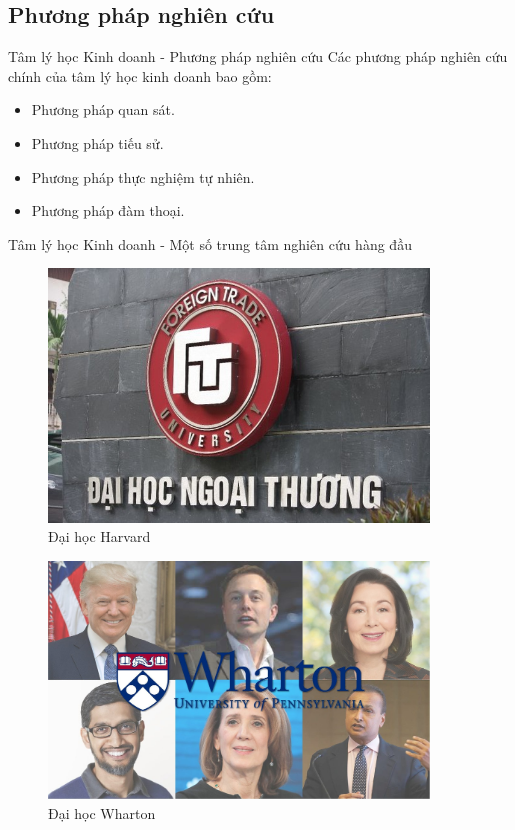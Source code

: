 \documentclass[../main.tex]{subfiles}
\begin{document}
\subsection{Phương pháp nghiên cứu}
\begin{frame}{Tâm lý học Kinh doanh - Phương pháp nghiên cứu}
Các phương pháp nghiên cứu chính của tâm lý học kinh doanh bao gồm:
\begin{itemize}
    \item Phương pháp quan sát.
    \item Phương pháp tiếu sử.
    \item Phương pháp thực nghiệm tự nhiên.
    \item Phương pháp đàm thoại.

\end{itemize}
\end{frame}

\begin{frame}{Tâm lý học Kinh doanh - Một số trung tâm nghiên cứu hàng đầu}
    \begin{minipage}{0.5\textwidth}
        \begin{figure}
            \centering
            \includegraphics[width=0.9\textwidth]{anh/Harvard.jpg}
            \caption{Đại học Harvard}
        \end{figure}
    \end{minipage}\hfill
    \begin{minipage}{0.5\textwidth}
        \begin{figure}
            \centering
            \includegraphics[width=0.9\textwidth]{anh/Wharton.jpg}
            \caption{Đại học Wharton}
        \end{figure}
    \end{minipage}
\end{frame}
\end{document}
